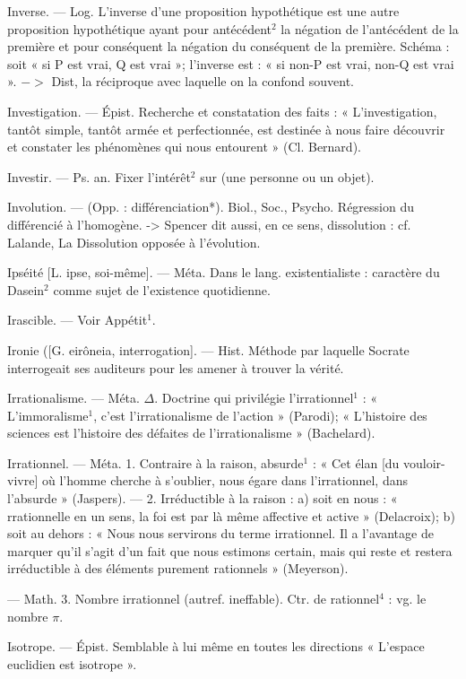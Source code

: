 Inverse. — Log. L'inverse d'une proposition
hypothétique est une autre
proposition hypothétique ayant pour
antécédent$^2$ la négation de l’antécédent
de la première et pour conséquent
la négation du conséquent
de la première. Schéma : soit « si P
est vrai, Q est vrai »; l'inverse est :
« si non-P est vrai, non-Q est vrai ».
$->$ Dist, la réciproque avec laquelle
on la confond souvent.

Investigation. — Épist. Recherche
et constatation des faits : « L'investigation,
tantôt simple, tantôt
armée et perfectionnée, est destinée
à nous faire découvrir et constater
les phénomènes qui nous entourent »
(Cl. Bernard).

Investir. — Ps. an. Fixer l'intérêt$^2$
sur (une personne ou un objet).

Involution. — (Opp. : différenciation*).
Biol., Soc., Psycho. Régression du
différencié à l’homogène. -> Spencer
dit aussi, en ce sens, dissolution :
cf. Lalande, La Dissolution opposée
à l’évolution.

Ipséité [L. ipse, soi-même]. — Méta.
Dans le lang. existentialiste : caractère
du Dasein$^2$ comme sujet de
l’existence quotidienne.

Irascible. — Voir Appétit$^1$.

Ironie ([G. eirôneia, interrogation]. —
Hist. Méthode par laquelle Socrate
interrogeait ses auditeurs pour les
amener à trouver la vérité.

Irrationalisme. — Méta. $\Delta$. Doctrine
qui privilégie l’irrationnel$^1$ : « L’immoralisme$^1$,
c’est l’irrationalisme de
l’action » (Parodi); « L’histoire des
sciences est l’histoire des défaites
de l’irrationalisme » (Bachelard).

Irrationnel. — Méta. 1. Contraire à la
raison, absurde$^1$ : « Cet élan [du
vouloir-vivre] où l’homme cherche
à s’oublier, nous égare dans l’irrationnel,
dans l’absurde » (Jaspers).
— 2. Irréductible à la raison : a) soit
en nous : « rrationnelle en un sens,
la foi est par là même affective et
active » (Delacroix); b) soit au
dehors : « Nous nous servirons du
terme irrationnel. Il a l'avantage de
marquer qu'il s’agit d’un fait que
nous estimons certain, mais qui reste
et restera irréductible à des éléments
purement rationnels » (Meyerson).

— Math. 3. Nombre irrationnel
(autref. ineffable). Ctr. de rationnel$^4$ :
vg. le nombre $\pi$.

Isotrope. — Épist. Semblable à lui
même en toutes les directions
« L'espace euclidien est isotrope ».

